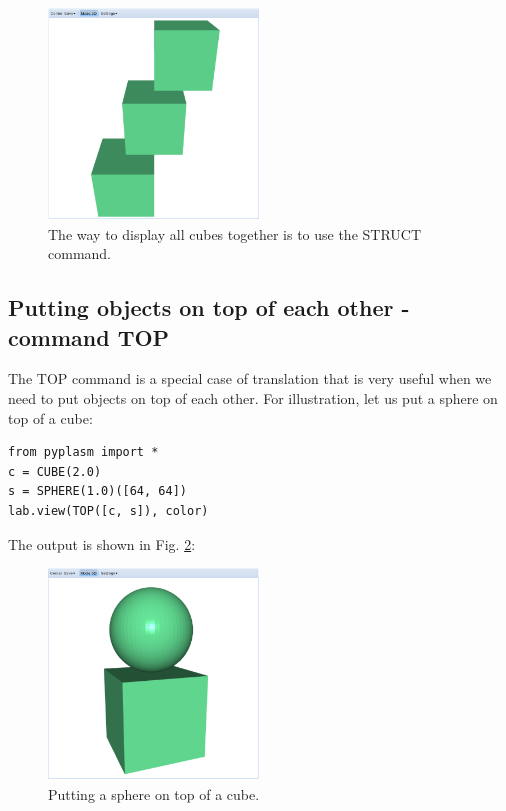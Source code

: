 \documentclass[article,A4,12pt]{llncs}
\begin{document}
\begin{figure}[!ht]
\begin{center}
\includegraphics[width=0.5\textwidth]{img/comp-1.png}
\end{center}
\vspace{-2mm}
\caption{The way to display all cubes together is to use the STRUCT command.}
\label{fig:comp-1}
\end{figure}


\subsection{Putting objects on top of each other - command TOP}

The TOP command is a special case of translation that is very 
useful when we need to put objects on top of each other.
For illustration, let us put a sphere on top of a cube:

\begin{verbatim}
from pyplasm import *
c = CUBE(2.0)
s = SPHERE(1.0)([64, 64])
lab.view(TOP([c, s]), color)
\end{verbatim}
The output is shown in Fig. \ref{fig:top-1}:

\newpage

\begin{figure}[!ht]
\begin{center}
\includegraphics[width=0.5\textwidth]{img/top-1.png}
\end{center}
\vspace{-2mm}
\caption{Putting a sphere on top of a cube.}
\label{fig:top-1}
\end{figure}
\end{document}
